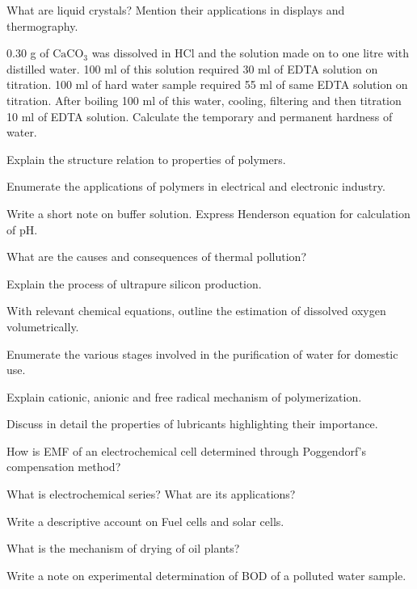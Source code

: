 \item What are liquid crystals? Mention their applications in displays and thermography.
\item 0.30 g of $\text{CaCO}_3$ was dissolved in HCl and the solution made on to one litre
  with distilled water. 100 ml
  of this solution required 30 ml of EDTA solution on titration. 100 ml of hard water sample
  required 55 ml of same EDTA solution on 
  titration. After boiling 100 ml of this water, cooling, filtering and then titration 10 ml
  of EDTA solution. Calculate the temporary
  and permanent hardness of water.
\item Explain the structure relation to properties of polymers.
\item Enumerate the applications of polymers in electrical and electronic industry.
\item Write a short note on buffer solution. Express Henderson equation for calculation of pH.
\item What are the causes and consequences of thermal pollution?

\markB
\partCo

\item \iitem \iitem Explain the process of ultrapure silicon production. 

\newpage \again

\item With relevant chemical equations, outline the estimation of dissolved oxygen
  volumetrically. 
\ene
\Or
\item  Enumerate the various stages involved in the purification of water for domestic use.
\ene

\item \iitem Explain cationic, anionic and free radical mechanism of polymerization.
\Or
\item Discuss in detail the properties of lubricants highlighting their importance.
\ene

\item \iitem \iitem How is EMF of an electrochemical cell determined through
  Poggendorf's compensation method? 
\item What is electrochemical series? What are its applications? 
\ene
\Or
\item Write a descriptive account on Fuel cells and solar cells.
\ene

\item \iitem \iitem What is the mechanism of drying of oil plants? 
\item Write a note on experimental determination of BOD of a polluted water sample. 

